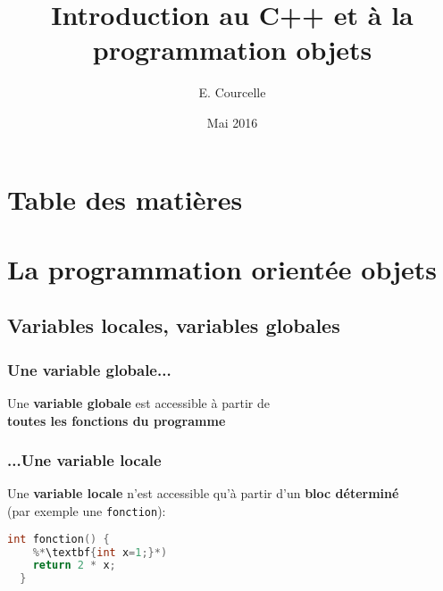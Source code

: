 \documentclass{beamer}
\title{Introduction au C++ et à la programmation objets}
\author{E. Courcelle}\institute{CALMIP, UMS 3669}
\date{Mai 2016}
\begin{document}
  \begin{frame}
  \titlepage
  \end{frame}

  \section*{Table des matières}
  \begin{frame}
    \tableofcontents
  \end{frame}

  \section{La programmation orientée objets}

  \subsection{Variables locales, variables globales}
  \begin{frame}
  \frametitle {Une variable globale...}

  Une \textbf{variable globale} est accessible à partir de \\ \textbf{toutes les fonctions du programme}
  
  \end{frame}

  \begin{frame}[fragile=singleslide,shrink=20]
  \frametitle {...Une variable locale}
  
  Une \textbf{variable locale} n'est accessible qu'à partir d'un \textbf{bloc déterminé} \\
  (par exemple une \texttt{fonction}):

  \begin{lstlisting}[language=c++]
  int fonction() {
    %*\textbf{int x=1;}*)
    return 2 * x;         
  }
  \end{lstlisting}
  \end{frame}
\end{document}
